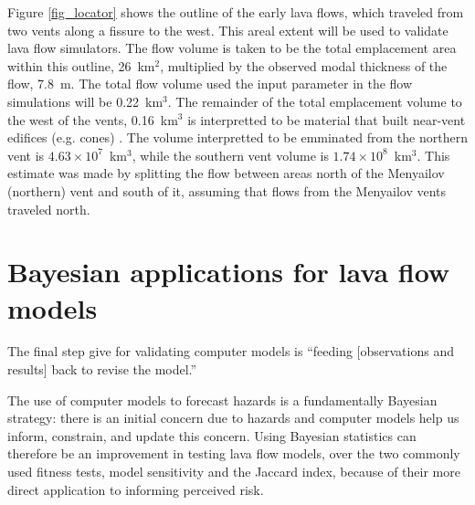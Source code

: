 Figure \ref{fig_locator} shows the outline of the early lava flows, which traveled from two vents along a fissure to the west. This areal extent will be used to validate lava flow simulators. The flow volume is taken to be the total emplacement area within this outline, 26~km$^2$, multiplied by the observed modal thickness of the flow, 7.8~m. The total flow volume used the input parameter in the flow simulations will be 0.22~km$^3$. The remainder of the total emplacement volume to the west of the vents, 0.16~km$^3$ is interpretted to be material that built near-vent edifices (e.g. cones) \citep{kubanek2015lava}. The volume interpretted to be emminated from the northern vent is $4.63\times 10^7$~km$^3$, while the southern vent volume is $1.74\times 10^8$~km$^3$. This estimate was made by splitting the flow between areas north of the Menyailov (northern) vent and south of it, assuming that flows from the Menyailov vents traveled north.
	











\section{Bayesian applications for lava flow models}\label{sec:Bayesian}
	The final step \citet{bayarri2007framework} give for validating computer models is ``feeding [observations and results] back to revise the model.''
	
	The use of computer models to forecast hazards is a fundamentally Bayesian strategy: there is an initial concern due to hazards and computer models help us inform, constrain, and update this concern. Using Bayesian statistics can therefore be an improvement in testing lava flow models, over the two commonly used fitness tests, model sensitivity and the Jaccard index, because of their more direct application to informing perceived risk. 
	
